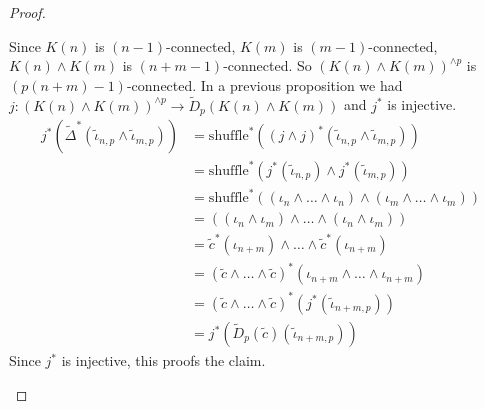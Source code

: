 \documentclass[language=english]{TemplateLecture}
\begin{document}
\begin{proof}
\begin{enumerate}
        Since \(K(n)\) is \((n-1)\)-connected, \(K(m)\) is \((m-1)\)-connected, \(K(n)\wedge K(m)\) is \((n+m-1)\)-connected. So \((K(n)\wedge K(m))^{\wedge p}\) is \((p(n+m)-1)\)-connected. In a previous proposition we had \(j\colon (K(n)\wedge K(m))^{\wedge p} \to \tilde D_p(K(n)\wedge K(m))\) and \(j^*\) is injective.
        \[\begin{split}
            j^*(\tilde \Delta^*(\tilde \iota_{n,p}\wedge \tilde \iota_{m,p})) &= \text{shuffle}^*((j\wedge j)^*(\tilde \iota_{n,p}\wedge \tilde \iota_{m,p})) \\
            &= \text{shuffle}^*(j^*(\tilde \iota_{n,p})\wedge j^*(\tilde\iota_{m,p})) \\
            &= \text{shuffle}^*((\iota_n\wedge \dots \wedge \iota_n) \wedge (\iota_m\wedge \dots \wedge \iota_m)) \\
            &= ((\iota_n\wedge \iota_m)\wedge \dots \wedge (\iota_n\wedge \iota_m)) \\
            &= \tilde c^*(\iota_{n+m})\wedge \dots \wedge \tilde c^*(\iota_{n+m}) \\
            &= (\tilde c\wedge \dots \wedge \tilde c)^*(\iota_{n+m}\wedge\dots \wedge \iota_{n+m}) \\
            &= (\tilde c\wedge \dots \wedge\tilde c)^*(j^*(\tilde\iota_{n+m, p})) \\
            &= j^*(\tilde D_p(\tilde c)(\tilde\iota_{n+m, p}))
        \end{split}\]
        Since \(j^*\) is injective, this proofs the claim.


\end{enumerate}
\end{proof}
\end{document}
